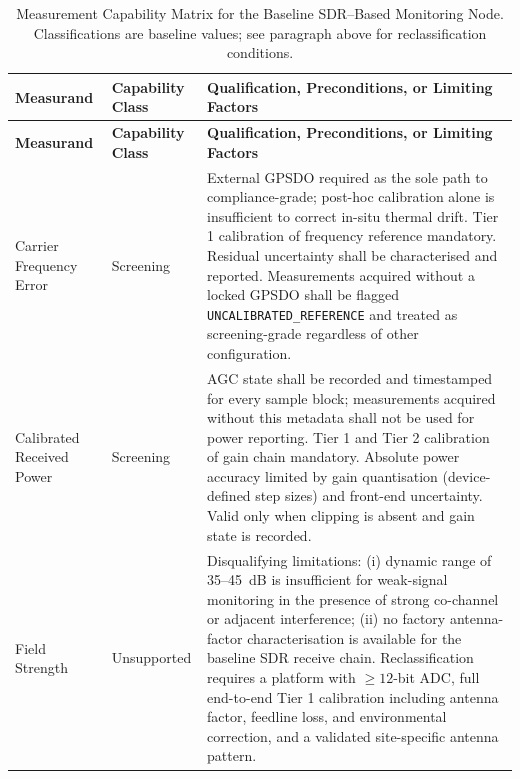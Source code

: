 \documentclass[11pt]{article}
\begin{document}
\begin{longtable}{L{3.2cm}L{2.2cm}L{8.6cm}}
\caption{Measurement Capability Matrix for the Baseline SDR--Based Monitoring Node. Classifications are baseline values; see paragraph above for reclassification conditions.}
\label{tab:capability}\\
\toprule
{}
\textbf{Measurand} & \textbf{Capability Class} & \textbf{Qualification, Preconditions, or Limiting Factors} \\
\midrule
\endfirsthead
\toprule
{}
\textbf{Measurand} & \textbf{Capability Class} & \textbf{Qualification, Preconditions, or Limiting Factors} \\
\midrule
\endhead
\bottomrule
\endfoot

Carrier Frequency Error & Screening &
External GPSDO required as the sole path to compliance-grade; post-hoc calibration alone is insufficient to correct in-situ thermal drift. Tier 1 calibration of frequency reference mandatory. Residual uncertainty shall be characterised and reported. Measurements acquired without a locked GPSDO shall be flagged \texttt{UNCALIBRATED\_REFERENCE} and treated as screening-grade regardless of other configuration. \\

Calibrated Received Power & Screening &
AGC state shall be recorded and timestamped for every sample block; measurements acquired without this metadata shall not be used for power reporting. Tier 1 and Tier 2 calibration of gain chain mandatory. Absolute power accuracy limited by gain quantisation (device-defined step sizes) and front-end uncertainty. Valid only when clipping is absent and gain state is recorded. \\

Field Strength & Unsupported &
Disqualifying limitations: (i) dynamic range of 35--45~dB is insufficient for weak-signal monitoring in the presence of strong co-channel or adjacent interference; (ii) no factory antenna-factor characterisation is available for the baseline SDR receive chain. Reclassification requires a platform with $\geq 12$-bit ADC, full end-to-end Tier 1 calibration including antenna factor, feedline loss, and environmental correction, and a validated site-specific antenna pattern. \\


\end{longtable}
\end{document}
